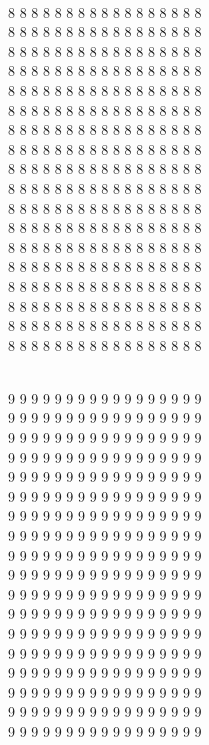 \documentclass{article}
\begin{document}
\vspace{5mm}
\hspace{2mm} \\
8 8 8 8 8 8 8 8 8 8 8 8 8 8 8 8 8 \\
8 8 8 8 8 8 8 8 8 8 8 8 8 8 8 8 8 \\
8 8 8 8 8 8 8 8 8 8 8 8 8 8 8 8 8 \\
8 8 8 8 8 8 8 8 8 8 8 8 8 8 8 8 8 \\
8 8 8 8 8 8 8 8 8 8 8 8 8 8 8 8 8 \\
8 8 8 8 8 8 8 8 8 8 8 8 8 8 8 8 8 \\
8 8 8 8 8 8 8 8 8 8 8 8 8 8 8 8 8 \\
8 8 8 8 8 8 8 8 8 8 8 8 8 8 8 8 8 \\
8 8 8 8 8 8 8 8 8 8 8 8 8 8 8 8 8 \\
8 8 8 8 8 8 8 8 8 8 8 8 8 8 8 8 8 \\
8 8 8 8 8 8 8 8 8 8 8 8 8 8 8 8 8 \\
8 8 8 8 8 8 8 8 8 8 8 8 8 8 8 8 8 \\
8 8 8 8 8 8 8 8 8 8 8 8 8 8 8 8 8 \\
8 8 8 8 8 8 8 8 8 8 8 8 8 8 8 8 8 \\
8 8 8 8 8 8 8 8 8 8 8 8 8 8 8 8 8 \\
8 8 8 8 8 8 8 8 8 8 8 8 8 8 8 8 8 \\
8 8 8 8 8 8 8 8 8 8 8 8 8 8 8 8 8 \\
8 8 8 8 8 8 8 8 8 8 8 8 8 8 8 8 8 \\

\pagebreak

\vspace{5mm}
\hspace{2mm} \\
9 9 9 9 9 9 9 9 9 9 9 9 9 9 9 9 9 \\
9 9 9 9 9 9 9 9 9 9 9 9 9 9 9 9 9 \\
9 9 9 9 9 9 9 9 9 9 9 9 9 9 9 9 9 \\
9 9 9 9 9 9 9 9 9 9 9 9 9 9 9 9 9 \\
9 9 9 9 9 9 9 9 9 9 9 9 9 9 9 9 9 \\
9 9 9 9 9 9 9 9 9 9 9 9 9 9 9 9 9 \\
9 9 9 9 9 9 9 9 9 9 9 9 9 9 9 9 9 \\
9 9 9 9 9 9 9 9 9 9 9 9 9 9 9 9 9 \\
9 9 9 9 9 9 9 9 9 9 9 9 9 9 9 9 9 \\
9 9 9 9 9 9 9 9 9 9 9 9 9 9 9 9 9 \\
9 9 9 9 9 9 9 9 9 9 9 9 9 9 9 9 9 \\
9 9 9 9 9 9 9 9 9 9 9 9 9 9 9 9 9 \\
9 9 9 9 9 9 9 9 9 9 9 9 9 9 9 9 9 \\
9 9 9 9 9 9 9 9 9 9 9 9 9 9 9 9 9 \\
9 9 9 9 9 9 9 9 9 9 9 9 9 9 9 9 9 \\
9 9 9 9 9 9 9 9 9 9 9 9 9 9 9 9 9 \\
9 9 9 9 9 9 9 9 9 9 9 9 9 9 9 9 9 \\
9 9 9 9 9 9 9 9 9 9 9 9 9 9 9 9 9 \\
\end{document}
